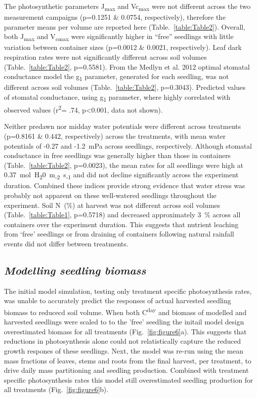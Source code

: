 \documentclass[a4paper]{article}\usepackage[]{graphicx}\usepackage[]{color}
\begin{document}
The photosynthetic parameters J\textsubscript{max} and Vc\textsubscript{max} were not different across the two measurement campaigns (p=0.1251 \& 0.0754, respectively), therefore the parameter means per volume are reported here (Table.~\ref{table:Table2}).  Overall, both J\textsubscript{max} and V\textsubscript{cmax} were significantly higher in “free” seedlings with little variation between container sizes (p=0.0012 \& 0.0021, respectively). Leaf dark respiration rates were not significantly different across soil volumes (Table.~\ref{table:Table2}, p=0.5581). From the Medlyn et al. 2012 optimal stomatal conductance model the g\textsubscript{1} parameter, generated for each seedling, was not different across soil volumes (Table.~\ref{table:Table2}, p=0.3043). Predicted values of stomatal conductance, using g\textsubscript{1} parameter, where highly correlated with observed values (r\textsuperscript{2}= .74, p\textless0.001, data not shown).

Neither predawn nor midday water potentials were different across treatments (p=0.8161 \& 0.442, respectively) across the treatments, with mean water potentials of -0.27 and -1.2~mPa across seedlings, respectively. Although stomatal conductance in free seedlings was generally higher than those in containers (Table.~\ref{table:Table2}, p=0.0023), the mean rates for all seedlings were high at 0.37~mol~H\textsubscript{2}0~m\textsubscript{-2}~s\textsubscript{-1} and did not decline significantly across the experiment duration. Combined these indices provide strong evidence that water stress was probably not apparent on these well-watered seedlings throughout the experiment. Soil N~(\%) at harvest was not different across soil volumes (Table.~\ref{table:Table1}, p=0.5718) and decreased approximately 3~\% across all containers over the experiment duration. This suggests that nutrient leaching from ‘free’ seedlings or from draining of containers following natural rainfall events did not differ between treatments. 

\subsection*{\textit{Modelling seedling biomass}}
The initial model simulation, testing only treatment specific photosynthesis rates, was unable to accurately predict the responses of actual harvested seedling biomass to reducecd soil volume.  When both C\textsuperscript{day} and biomass of modelled and harvested seedlings were scaled to to the 'free' seedling the initail model design overestimated biomass for all treatments (Fig.~\ref{fig:figure6}a).  This suggests that reductions in photosynthesis alone could not relatistically capture the reduced growth respones of these seedlings.  Next, the model was re-run using the mean mass fractions of leaves, stems and roots from the final harvest, per treatment, to drive daily mass partitioning and seedling production.  Combined with treatment specific photosynthesis rates this model still overestimated seedling production for all treatments (Fig.~\ref{fig:figure6}b).  
\end{document}
